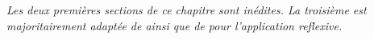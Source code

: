 \stars

\textit{Les deux premières sections de ce chapitre sont inédites. La troisième est majoritairement adaptée de \cite{raimbault2017knowledge} ainsi que de \cite{raimbault2017co} pour l'application reflexive.}






